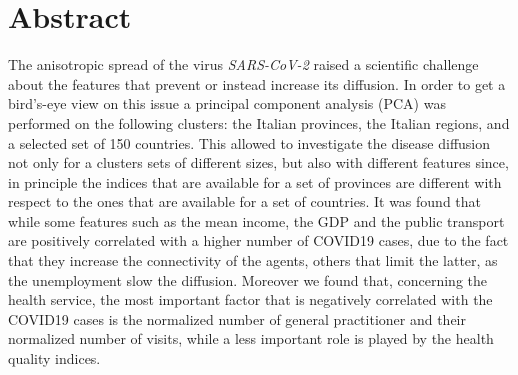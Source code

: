 \documentclass[
12pt, %
a4paper, %
oneside, %
headinclude,footinclude, %
BCOR5mm, %
]{scrartcl}
\begin{document}
\section*{Abstract} %
The anisotropic spread of the virus \textit{SARS-CoV-2} raised a scientific challenge about the features that prevent or instead increase its diffusion. In order to get a bird's-eye view on this issue a principal component analysis (PCA) was performed on the following clusters: the Italian provinces, the Italian regions, and a selected set of 150 countries. This allowed to investigate the disease diffusion not only for a clusters sets of different sizes, but also with different features since, in principle the indices that are available for a set of provinces are different with respect to the ones that are available for a set of countries. It was found that while some features such as the mean income, the GDP and the public transport are positively correlated with a higher number of COVID19 cases, due to the fact that they increase the connectivity of the agents, others that limit the latter, as the unemployment slow the diffusion. Moreover we found that, concerning the health service, the most important factor that is negatively correlated with the COVID19 cases is the normalized number of general practitioner and their normalized number of visits, while a less important role is played by the health quality indices.

\nocite{*}
\setcounter{tocdepth}{2} %

\tableofcontents %




\newpage %
\end{document}
